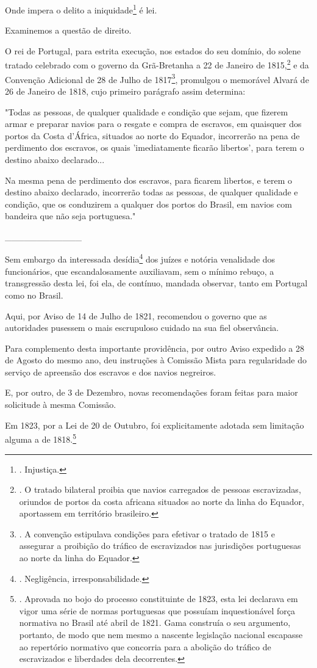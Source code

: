 Onde impera o delito a iniquidade\footnote{. Injustiça.} é lei.

Examinemos a questão de direito.

O rei de Portugal, para estrita execução, nos estados do seu domínio, do
solene tratado celebrado com o governo da Grã-Bretanha a 22 de Janeiro
de 1815,\footnote{. O tratado bilateral proibia que navios carregados de
  pessoas escravizadas, oriundos de portos da costa africana situados ao
  norte da linha do Equador, aportassem em território brasileiro.} e da
Convenção Adicional de 28 de Julho de 1817\footnote{. A convenção
  estipulava condições para efetivar o tratado de 1815 e assegurar a
  proibição do tráfico de escravizados nas jurisdições portuguesas ao
  norte da linha do Equador.}, promulgou o memorável Alvará de 26 de
Janeiro de 1818, cujo primeiro parágrafo assim determina:

"Todas as pessoas, de qualquer qualidade e condição que sejam, que
fizerem armar e preparar navios para o resgate e compra de escravos, em
quaisquer dos portos da Costa d'África, situados ao norte do Equador,
incorrerão na pena de perdimento dos escravos, os quais 'imediatamente
ficarão libertos', para terem o destino abaixo declarado...

Na mesma pena de perdimento dos escravos, para ficarem libertos, e terem
o destino abaixo declarado, incorrerão todas as pessoas, de qualquer
qualidade e condição, que os conduzirem a qualquer dos portos do Brasil,
em navios com bandeira que não seja portuguesa."

\_\_\_\_\_\_\_\_\_\_\_\_

Sem embargo da interessada desídia\footnote{. Negligência,
  irresponsabilidade.} dos juízes e notória venalidade dos funcionários,
que escandalosamente auxiliavam, sem o mínimo rebuço, a transgressão
desta lei, foi ela, de contínuo, mandada observar, tanto em Portugal
como no Brasil.

Aqui, por Aviso de 14 de Julho de 1821, recomendou o governo que as
autoridades pusessem o mais escrupuloso cuidado na sua fiel observância.

Para complemento desta importante providência, por outro Aviso expedido
a 28 de Agosto do mesmo ano, deu instruções à Comissão Mista para
regularidade do serviço de apreensão dos escravos e dos navios
negreiros.

E, por outro, de 3 de Dezembro, novas recomendações foram feitas para
maior solicitude à mesma Comissão.

Em 1823, por a Lei de 20 de Outubro, foi explicitamente adotada sem
limitação alguma a de 1818.\footnote{. Aprovada no bojo do processo
  constituinte de 1823, esta lei declarava em vigor uma série de normas
  portuguesas que possuíam inquestionável força normativa no Brasil até
  abril de 1821. Gama construía o seu argumento, portanto, de modo que
  nem mesmo a nascente legislação nacional escapasse ao repertório
  normativo que concorria para a abolição do tráfico de escravizados e
  liberdades dela decorrentes.}


